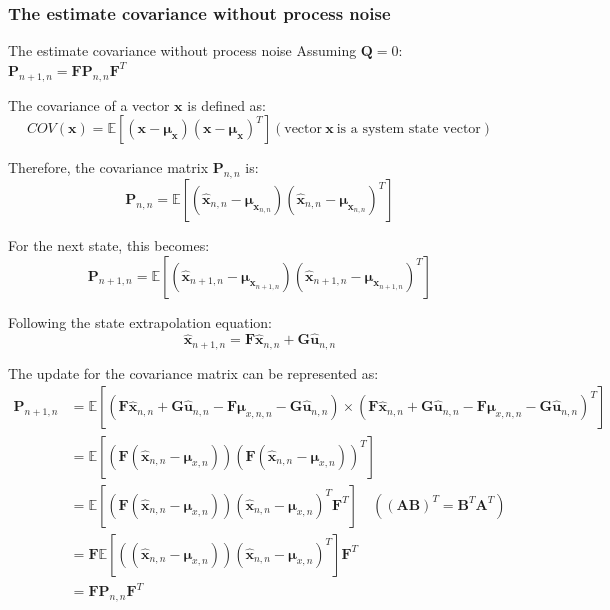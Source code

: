 \subsubsection{The estimate covariance without process noise}
\begin{frame}{The estimate covariance without process noise}
Assuming $\mathbf{Q}=0$:
$\mathbf{P}_{n+1,n}=\mathbf{F}\mathbf{P}_{n,n}\mathbf{F}^T$

The covariance of a vector \(\mathbf{x}\) is defined as:
\begin{equation*}
{COV}(\mathbf{x}) = \mathbb{E}\left[ (\mathbf{x}-\boldsymbol{\mu}_{\mathbf{x}})(\mathbf{x}-\boldsymbol{\mu}_{\mathbf{x}})^T \right] (\text{vector}~\mathbf{x}~\text{is a system state vector})
\end{equation*}

Therefore, the covariance matrix \(\mathbf{P}_{n,n}\) is:
\begin{equation*}
\mathbf{P}_{n,n} = \mathbb{E}\left[ (\hat{\mathbf{x}}_{n,n} - \boldsymbol{\mu}_{\mathbf{x}_{n,n}})(\hat{\mathbf{x}}_{n,n} - \boldsymbol{\mu}_{\mathbf{x}_{n,n}})^T \right]
\end{equation*}

For the next state, this becomes:
\begin{equation*}
\mathbf{P}_{n+1,n} = \mathbb{E}\left[ (\hat{\mathbf{x}}_{n+1,n} - \boldsymbol{\mu}_{\mathbf{x}_{n+1,n}})(\hat{\mathbf{x}}_{n+1,n} - \boldsymbol{\mu}_{\mathbf{x}_{n+1,n}})^T \right]
\end{equation*}

Following the state extrapolation equation:
\begin{equation*}
\hat{\mathbf{x}}_{n+1,n} = \mathbf{F} \hat{\mathbf{x}}_{n,n} + \mathbf{G}\hat{\mathbf{u}}_{n,n}
\end{equation*}

The update for the covariance matrix can be represented as:
\begin{align*}
\mathbf{P}_{n+1,n} & = \mathbb{E} \left[ (\mathbf{F} \mathbf{\hat{x}}_{n,n} + \mathbf{G}\mathbf{\hat{u}}_{n,n} - \mathbf{F}\mathbf{\mu}_{x,n,n} - \mathbf{G}\mathbf{\hat{u}}_{n,n}) \times (\mathbf{F} \mathbf{\hat{x}}_{n,n} + \mathbf{G}\mathbf{\hat{u}}_{n,n} - \mathbf{F}\mathbf{\mu}_{x,n,n} - \mathbf{G}\mathbf{\hat{u}}_{n,n})^T \right]\\
& = \mathbb{E} \left[ (\mathbf{F} (\mathbf{\hat{x}}_{n,n} - \mathbf{\mu}_{x,n}) ) (\mathbf{F} (\mathbf{\hat{x}}_{n,n} - \mathbf{\mu}_{x,n}) )^T \right]\\
& = \mathbb{E} \left[ (\mathbf{F} (\mathbf{\hat{x}}_{n,n} - \mathbf{\mu}_{x,n}) ) (\mathbf{\hat{x}}_{n,n} - \mathbf{\mu}_{x,n})^T \mathbf{F}^T\right] \quad ((\mathbf{AB})^T = \mathbf{B}^T\mathbf{A}^T)\\
& = \mathbf{F} \mathbb{E} \left[ ( (\mathbf{\hat{x}}_{n,n} - \mathbf{\mu}_{x,n}) ) (\mathbf{\hat{x}}_{n,n} - \mathbf{\mu}_{x,n})^T \right]\mathbf{F}^T \\
&= \mathbf{F}\mathbf{P}_{n,n}\mathbf{F}^T
\end{align*}

\end{frame}
